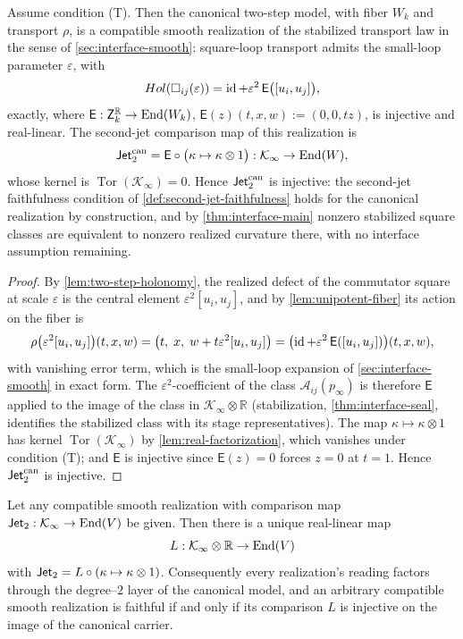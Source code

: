 \begin{theorem}
	\label{thm:canonical-realization}
	Assume condition \textup{(T)}.  Then the canonical two-step model,
	with fiber \(W_k\) and transport \(\rho\), is a compatible smooth
	realization of the stabilized transport law in the sense of
	\cref{sec:interface-smooth}: square-loop transport admits the
	small-loop parameter \(\varepsilon\), with
	\[
		Hol(\square_{ij}(\varepsilon))
		=
		\operatorname{id}
		+
		\varepsilon^2\,\mathsf E\bigl([u_i,u_j]\bigr),
	\]
	exactly, where
	\(\mathsf E:\mathsf Z_k^{\mathbb R}\to\mathrm{End}(W_k)\),
	\(\mathsf E(z)(t,x,w):=(0,0,tz)\), is injective and real-linear.
	The second-jet comparison map of this realization is
	\[
		\mathsf{Jet}_2^{\mathrm{can}}
		=
		\mathsf E\circ\bigl(\kappa\mapsto\kappa\otimes1\bigr)
		:\mathcal K_\infty\to\mathrm{End}(W),
	\]
	whose kernel is \(\operatorname{Tor}(\mathcal K_\infty)=0\).  Hence
	\(\mathsf{Jet}_2^{\mathrm{can}}\) is injective: the second-jet faithfulness
	condition of \cref{def:second-jet-faithfulness} holds for the
	canonical realization by construction, and by
	\cref{thm:interface-main} nonzero stabilized square classes are
	equivalent to nonzero realized curvature there, with no interface
	assumption remaining.
\end{theorem}
\begin{proof}
	By \cref{lem:two-step-holonomy}, the realized defect of the
	commutator square at scale \(\varepsilon\) is the central element
	\(\varepsilon^2[u_i,u_j]\), and by \cref{lem:unipotent-fiber} its
	action on the fiber is
	\[
		\rho\bigl(\varepsilon^2[u_i,u_j]\bigr)(t,x,w)
		=
		\bigl(t,\;x,\;w+t\varepsilon^2[u_i,u_j]\bigr)
		=
		\bigl(\operatorname{id}+\varepsilon^2\,\mathsf E([u_i,u_j])\bigr)(t,x,w),
	\]
	with vanishing error term, which is the small-loop expansion of
	\cref{sec:interface-smooth} in exact form.  The
	\(\varepsilon^2\)-coefficient of the class
	\(\mathcal A_{ij}(p_\infty)\) is therefore
	\(\mathsf E\) applied to the image of the class in
	\(\mathcal K_\infty\otimes\mathbb R\) (stabilization,
	\cref{thm:interface-seal}, identifies the stabilized class with its
	stage representatives).  The map \(\kappa\mapsto\kappa\otimes1\) has
	kernel \(\operatorname{Tor}(\mathcal K_\infty)\) by
	\cref{lem:real-factorization}, which vanishes under condition
	\textup{(T)}; and \(\mathsf E\) is injective since
	\(\mathsf E(z)=0\) forces \(z=0\) at \(t=1\).  Hence
	\(\mathsf{Jet}_2^{\mathrm{can}}\) is injective.
\end{proof}
\begin{proposition}
	\label{prop:canonical-universality}
	Let any compatible smooth realization with comparison map
	\(\mathsf{Jet}_2:\mathcal K_\infty\to\mathrm{End}(V)\) be given.  Then there is a
	unique real-linear map
	\[
		L:\mathcal K_\infty\otimes\mathbb R\to\mathrm{End}(V)
	\]
	with
	\(\mathsf{Jet}_2=L\circ(\kappa\mapsto\kappa\otimes1)\).
	Consequently every realization's reading factors through the
	degree--\(2\) layer of the canonical model, and an arbitrary
	compatible smooth realization is faithful if and only if its
	comparison \(L\) is injective on the image of the canonical carrier.
\end{proposition}
